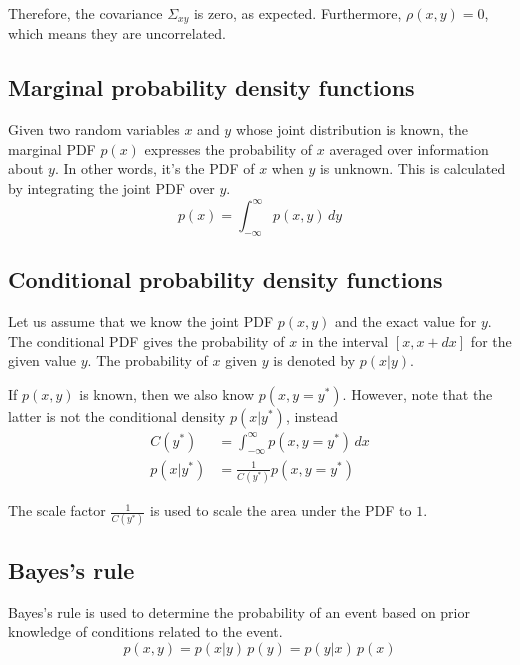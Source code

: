 Therefore, the covariance $\Sigma_{xy}$ is zero, as expected. Furthermore,
$\rho(x, y) = 0$, which means they are uncorrelated.

\subsection{Marginal probability density functions}

Given two random variables $x$ and $y$ whose joint distribution is known, the
marginal PDF $p(x)$ expresses the probability of $x$ averaged over information
about $y$. In other words, it's the PDF of $x$ when $y$ is unknown. This is
calculated by integrating the joint PDF over $y$.
\begin{equation*}
  p(x) = \int_{-\infty}^\infty p(x, y) \,dy
\end{equation*}

\subsection{Conditional probability density functions}

Let us assume that we know the joint PDF $p(x, y)$ and the exact value for $y$.
The conditional PDF gives the probability of $x$ in the interval $[x, x + dx]$
for the given value $y$. The probability of $x$ given $y$ is denoted by
$p(x|y)$.

If $p(x, y)$ is known, then we also know $p(x, y = y^\ast)$. However, note that
the latter is not the conditional density $p(x|y^\ast)$, instead
\begin{align*}
  C(y^\ast) &= \int_{-\infty}^\infty p(x, y = y^\ast) \,dx \\
  p(x|y^\ast) &= \frac{1}{C(y^\ast)} p(x, y = y^\ast)
\end{align*}

The scale factor $\frac{1}{C(y^\ast)}$ is used to scale the area under the PDF
to $1$.

\subsection{Bayes's rule}

Bayes's rule is used to determine the probability of an event based on prior
knowledge of conditions related to the event.
\begin{equation*}
  p(x, y) = p(x|y) \,p(y) = p(y|x) \,p(x)
\end{equation*}


